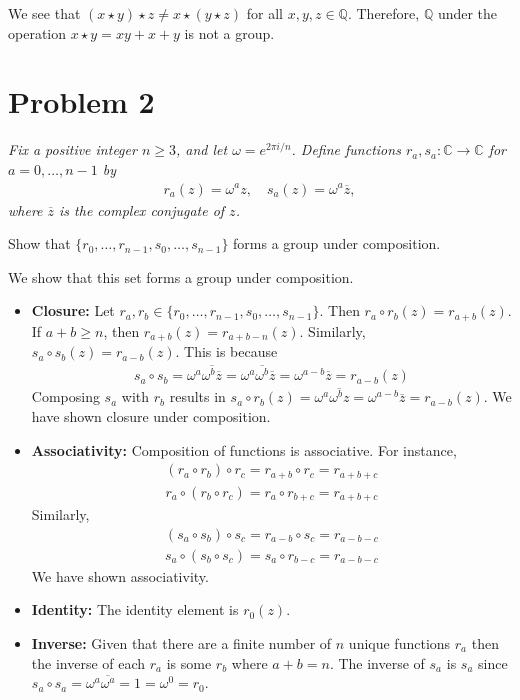 \documentclass{article}
\theoremstyle{plain} %
\theoremstyle{definition} %
\begin{document}
We see that $(x \star y) \star z \neq x \star (y \star z)$ for all $x,y,z \in \mathbb{Q}$.
Therefore, $\mathbb{Q}$ under the operation $x \star y = xy + x + y$ is not a group.
\\


\section*{Problem 2}
\noindent\textit{Fix a positive integer $n\geq 3$, and let $\omega = e^{2\pi i / n}$.
Define functions $r_a, s_a : \mathbb{C} \to \mathbb{C}$ for $a = 0,\ldots,n-1$
by 
\begin{align*}
    r_a(z) = \omega^a z, \quad s_a(z) = \omega^a\overline{z},
\end{align*}
where $\overline{z}$ is the complex conjugate of $z$.}

\noindent{} Show that $\{r_0,\ldots,r_{n-1},s_0,\ldots,s_{n-1}\}$ forms a group under composition.

We show that this set forms a group under composition.
\begin{itemize}
    \item \textbf{Closure:} Let $r_a, r_b \in \{r_0,\ldots,r_{n-1},s_0,\ldots,s_{n-1}\}$. Then $r_a \circ r_b(z) = r_{a+b}(z)$.
        If $a+b \geq n$, then $r_{a+b}(z) = r_{a+b-n}(z)$.
        Similarly, $s_a \circ s_b(z) = r_{a-b}(z)$. This is because
        \begin{align*}
            s_a \circ s_b = \omega^a \overline{\omega^b \overline{z}} = \omega^a \overline{\omega^b} \overline{z} = \omega^{a-b} \overline{z} = r_{a-b}(z)
        \end{align*}
        Composing $s_a$ with $r_b$ results in $s_a \circ r_b(z) = \omega^a \overline{\omega^b z} = \omega^{a-b} \overline{z} = r_{a-b}(z)$.
        We have shown closure under composition.
    \item \textbf{Associativity:} Composition of functions is associative. For instance,
        \begin{align*}
            (r_a \circ r_b) \circ r_c = r_{a+b} \circ r_c = r_{a+b+c}
        \end{align*}
        \begin{align*}
            r_a \circ (r_b \circ r_c) = r_a \circ r_{b+c} = r_{a+b+c}
        \end{align*}
        Similarly,
        \begin{align*}
            (s_a \circ s_b) \circ s_c = r_{a-b} \circ s_c = r_{a-b-c}
        \end{align*}
        \begin{align*}
            s_a \circ (s_b \circ s_c) = s_a \circ r_{b-c} = r_{a-b-c}
        \end{align*}
        We have shown associativity.
    \item \textbf{Identity:} The identity element is $r_0(z)$.
    \item \textbf{Inverse:} Given that there are a finite number of $n$ unique functions $r_a$ then the inverse of
        each $r_a$ is some $r_b$ where $a+b = n$. The inverse of $s_a$ is $s_a$ since $s_a \circ s_a = \omega^{a}\overline{\omega^{a}} = 1 = \omega^0 = r_0$.
\end{itemize}
\end{document}
